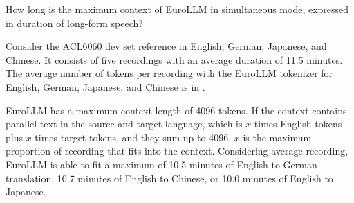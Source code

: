 \documentclass[11pt]{article}
\begin{document}
How long is the maximum context of EuroLLM in simultaneous mode, expressed in duration of long-form speech?

Consider the ACL6060 dev set reference in English, German, Japanese, and Chinese. It consists of five recordings with an average duration of 11.5 minutes. The average number of tokens per recording with the EuroLLM tokenizer for English, German, Japanese, and Chinese is in . 

EuroLLM has a maximum context length of 4096 tokens. If the context contains parallel text in the source and target language, which is $x$-times English tokens plus $x$-times target tokens, and they sum up to 4096, $x$ is the maximum proportion of recording that fits into the context. Considering average recording, EuroLLM is able to fit a maximum of 10.5 minutes of English to German translation, 10.7 minutes of English to Chinese, or 10.0 minutes of English to Japanese. 






\end{document}
